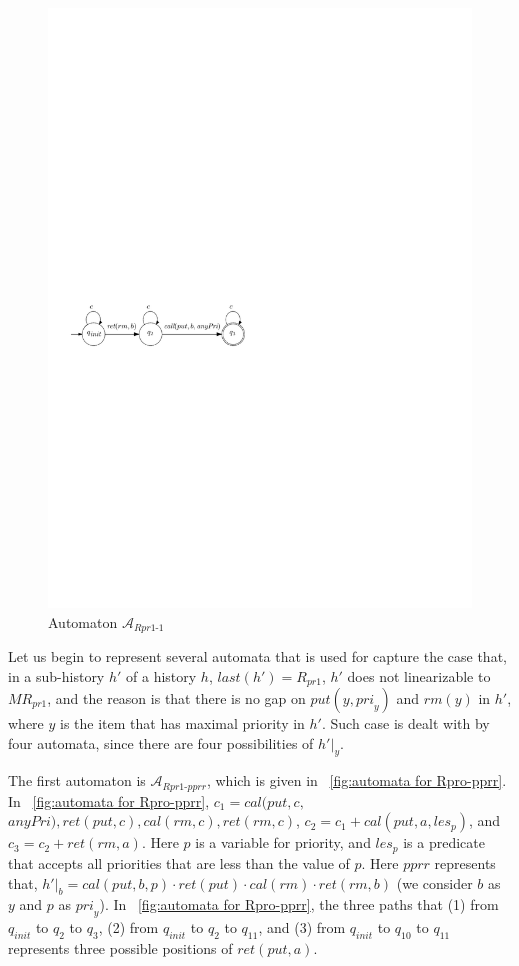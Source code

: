 \begin{figure}[htbp]
  \centering
  \includegraphics[width=0.5 \textwidth]{PIC_AUTO_UNMATCHED_Rpr1-1.pdf}
  \caption{Automaton $\mathcal{A}_{\textit{Rpr1-1}}$}
  \label{fig:automata for Rpro-1}
\end{figure}

Let us begin to represent several automata that is used for capture the case that, in a sub-history $h'$ of a history $h$, $\textit{last}(h')=R_{\textit{pr1}}$, $h'$ does not linearizable to $\textit{MR}_{\textit{pr1}}$, and the reason is that there is no gap on $\textit{put}(y,\textit{pri}_y)$ and $\textit{rm}(y)$ in $h'$, where $y$ is the item that has maximal priority in $h'$. Such case is dealt with by four automata, since there are four possibilities of $h' \vert_{y}$.

The first automaton is $\mathcal{A}_{\textit{Rpr1-pprr}}$, which is given in \figurename~\ref{fig:automata for Rpro-pprr}. In \figurename~\ref{fig:automata for Rpro-pprr}, $c_1= \textit{cal}(\textit{put},c,$ $\textit{anyPri}),\textit{ret}(\textit{put},c), \textit{cal}(\textit{rm},c), \textit{ret}(\textit{rm},c)$, $c_2 = c_1 + \textit{cal}(\textit{put},a,\textit{les}_p)$, and $c_3 = c_2 + \textit{ret}(\textit{rm},a)$. Here $p$ is a variable for priority, and $\textit{les}_p$ is a predicate that accepts all priorities that are less than the value of $p$. Here $\textit{pprr}$ represents that, $h' \vert_{b} = \textit{cal}(\textit{put},b,p) \cdot \textit{ret}(\textit{put}) \cdot \textit{cal}(\textit{rm}) \cdot \textit{ret}(\textit{rm},b)$ (we consider $b$ as $y$ and $p$ as $\textit{pri}_y$). In \figurename~\ref{fig:automata for Rpro-pprr}, the three paths that (1) from $q_{\textit{init}}$ to $q_2$ to $q_3$, (2) from $q_{\textit{init}}$ to $q_2$ to $q_{11}$, and (3) from $q_{\textit{init}}$ to $q_{10}$ to $q_{11}$ represents three possible positions of $\textit{ret}(\textit{put},a)$.

